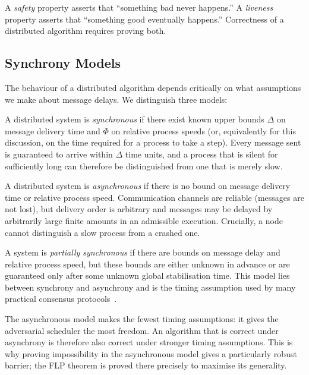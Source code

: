 \begin{smjdefinition}
A \emph{safety} property asserts that ``something bad never happens.'' A \emph{liveness} property asserts that ``something good eventually happens.'' Correctness of a distributed algorithm requires proving both.
\end{smjdefinition}

\subsection{Synchrony Models}\label{subsec:synchrony}

The behaviour of a distributed algorithm depends critically on what assumptions we make about message delays. We distinguish three models:

\begin{smjdefinition}
A distributed system is \emph{synchronous} if there exist known upper bounds $\Delta$ on message delivery time and $\Phi$ on relative process speeds (or, equivalently for this discussion, on the time required for a process to take a step). Every message sent is guaranteed to arrive within $\Delta$ time units, and a process that is silent for sufficiently long can therefore be distinguished from one that is merely slow.
\end{smjdefinition}

\begin{smjdefinition}
A distributed system is \emph{asynchronous} if there is no bound on message delivery time or relative process speed. Communication channels are reliable (messages are not lost), but delivery order is arbitrary and messages may be delayed by arbitrarily large finite amounts in an admissible execution. Crucially, a node cannot distinguish a slow process from a crashed one.
\end{smjdefinition}

\begin{smjdefinition}
A system is \emph{partially synchronous} if there are bounds on message delay and relative process speed, but these bounds are either unknown in advance or are guaranteed only after some unknown global stabilisation time. This model lies between synchrony and asynchrony and is the timing assumption used by many practical consensus protocols~\cite{dworkls1988}.
\end{smjdefinition}

The asynchronous model makes the fewest timing assumptions: it gives the adversarial scheduler the most freedom. An algorithm that is correct under asynchrony is therefore also correct under stronger timing assumptions. This is why proving impossibility in the asynchronous model gives a particularly robust barrier; the FLP theorem is proved there precisely to maximise its generality.

